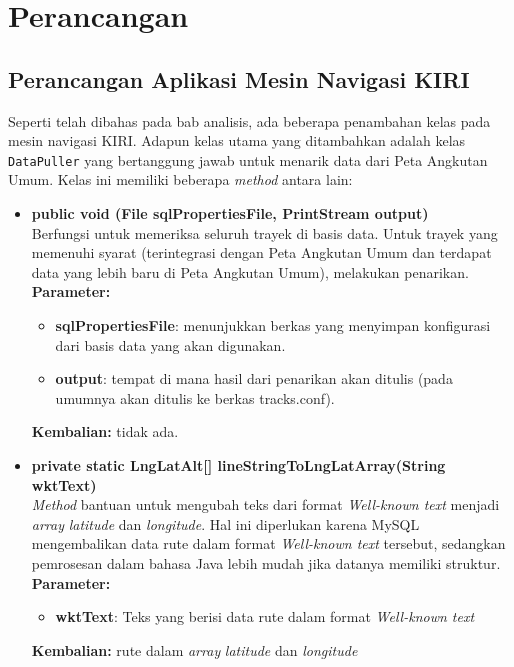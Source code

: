 \chapter{Perancangan}

\section{Perancangan Aplikasi Mesin Navigasi KIRI}

Seperti telah dibahas pada bab analisis, ada beberapa penambahan kelas pada mesin navigasi KIRI. Adapun kelas utama yang ditambahkan adalah kelas \texttt{DataPuller} yang bertanggung jawab untuk menarik data dari Peta Angkutan Umum. Kelas ini memiliki beberapa \textit{method} antara lain:

\begin{itemize}
	\item \textbf{public void (File sqlPropertiesFile, PrintStream output)} \\
		Berfungsi untuk memeriksa seluruh trayek di basis data. Untuk trayek yang memenuhi syarat (terintegrasi dengan Peta Angkutan Umum dan terdapat data yang lebih baru di Peta Angkutan Umum), melakukan penarikan. \\
		\textbf{Parameter:}
		\begin{itemize}
			\item \textbf{sqlPropertiesFile}: menunjukkan berkas yang menyimpan konfigurasi dari basis data yang akan digunakan.
			\item \textbf{output}: tempat di mana hasil dari penarikan akan ditulis (pada umumnya akan ditulis ke berkas tracks.conf).
		\end{itemize}
		\textbf{Kembalian:} tidak ada.
	\item \textbf{private static LngLatAlt[] lineStringToLngLatArray(String wktText)} \\
		\textit{Method} bantuan untuk mengubah teks dari format \textit{Well-known text} \cite{Herring:2011} menjadi \textit{array} \textit{latitude} dan \textit{longitude}. Hal ini diperlukan karena MySQL mengembalikan data rute dalam format \textit{Well-known text} tersebut, sedangkan pemrosesan dalam bahasa Java lebih mudah jika datanya memiliki struktur. \\
		\textbf{Parameter:}
		\begin{itemize}
			\item \textbf{wktText}: Teks yang berisi data rute dalam format \textit{Well-known text}
		\end{itemize}
		\textbf{Kembalian:} rute dalam \textit{array} \textit{latitude} dan \textit{longitude}

\end{itemize}
